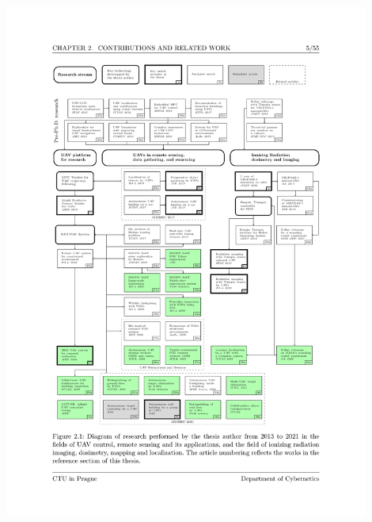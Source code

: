\documentclass[aspectratio=169]{beamer}
\begin{document}
\begin{frame}
\begin{columns}[c]
\includegraphics[width=0.9\textwidth,trim={2.0cm 5.0cm 2.5cm 5.2cm},clip]{./fig/pubgraph.pdf}

\end{columns}

\end{frame}


\end{document}
